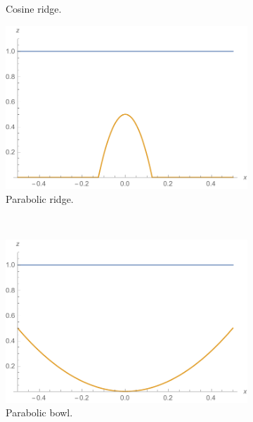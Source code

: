 \begin{figure}
\begin{subfigure}{0.45\textwidth}
    \caption{Cosine ridge.}
    \label{fig:bath-cosine}
  \end{subfigure}
  \begin{subfigure}{0.45\textwidth}
    \includegraphics[width=\textwidth]{diagrams/bath-para-ridge}
    \caption{Parabolic ridge.}
    \label{fig:bath-para-ridge}
  \end{subfigure} \\
  \begin{subfigure}{0.45\textwidth}
    \includegraphics[width=\textwidth]{diagrams/bath-para-bowl}
    \caption{Parabolic bowl.}
    \label{fig:bath-para-bowl}
  \end{subfigure}
  \begin{subfigure}{0.45\textwidth}

\end{subfigure}
\end{figure}
